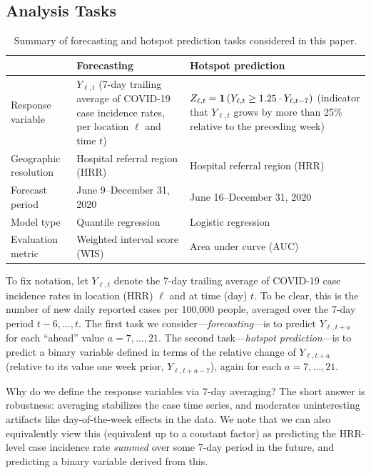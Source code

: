 \documentclass[9pt,twocolumn,twoside,lineno]{pnas-new}
\begin{document}
\subsection{Analysis Tasks}

\begin{table}[t]
\centering
\caption{Summary of forecasting and hotspot prediction tasks considered in
  this paper.}
\begin{tabular}{l p{2.75in} p{2.75in}}
  \toprule
  & \textbf{Forecasting} & \textbf{Hotspot prediction} \\
  \midrule
  Response variable & $Y_{\ell,t}$ (7-day trailing average of COVID-19 case 
incidence rates, per location $\ell$ and time $t$) & $Z_{\ell,t} =
\mathbf{1}\left(Y_{\ell,t} \geq 1.25 \cdot Y_{\ell,t-7}\right)$ (indicator that 
$Y_{\ell,t}$ grows by more than 25\% relative to the preceding week) \\ 
  Geographic resolution & Hospital referral region (HRR) & Hospital referral
region (HRR) \\ 
  Forecast period & June 9--December 31, 2020 & June 16--December 31, 2020 \\  
  Model type & Quantile regression & Logistic regression \\
  Evaluation metric & Weighted interval score (WIS) & Area under curve (AUC) \\
  \bottomrule
\end{tabular}
\label{tab:analysis_tasks}
\end{table}

To fix notation, let $Y_{\ell,t}$ denote the 7-day trailing average of COVID-19
case incidence rates in location (HRR) $\ell$ and at time (day) $t$.  To be
clear, this is the number of new daily reported cases per 100,000
people, averaged over the 7-day period $t-6, \ldots, t$. The first task we
consider---\textit{forecasting}---is to predict $Y_{\ell,t+a}$ for each
``ahead'' value $a=7,\ldots,21$.  The second task---\textit{hotspot
  prediction}---is to predict a binary variable defined in terms of the relative
change of $Y_{\ell,t+a}$ (relative to its value one week prior,
$Y_{\ell,t+a-7}$), again for each $a=7,\ldots,21$.   

Why do we define the response variables via 7-day averaging? The short answer 
is robustness: averaging stabilizes the case time series, and moderates
uninteresting artifacts like day-of-the-week effects in the data.  We note
that we can also equivalently view this (equivalent up to a constant factor) as 
predicting the HRR-level case incidence rate \textit{summed} over some 7-day
period in the future, and predicting a binary variable derived from this.     
\end{document}
